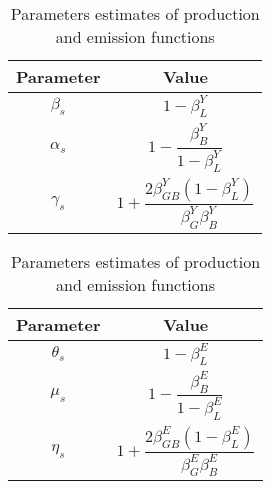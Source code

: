 \begin{table}[http]
    \centering
    \caption{\quad Parameters estimates of production and emission functions} \label{tab:estimate_parameters}
    \begin{tabular}{cc}
        \hline
        \textbf{Parameter} & \textbf{Value} \\
        \hline
        $\beta_{s}$ & $1-\beta_L^Y$ \vspace{5pt}
        \\
        $\alpha_{s}$ & $1-\dfrac{\beta_B^Y}{1-\beta_L^Y}$ \vspace{5pt}
        \\
        $\gamma_{s}$ & $1+\dfrac{2\beta_{GB}^Y(1-\beta_L^Y)}{\beta_G^Y\beta_B^Y}$ \vspace{5pt}
        \\
        \hline
    \end{tabular}
    \hspace{1cm}
    \begin{tabular}{cc}
      \hline
      \textbf{Parameter} & \textbf{Value} \\
      \hline
      $\theta_{s}$ & $1-\beta_L^E$ \vspace{5pt}
      \\
      $\mu_{s}$ & $1-\dfrac{\beta_B^E}{1-\beta_L^E}$ \vspace{5pt}
      \\
      $\eta_{s}$ & $1+\dfrac{2\beta_{GB}^E(1-\beta_L^E)}{\beta_G^E\beta_B^E}$ \vspace{5pt}
      \\
      \hline
  \end{tabular}
\end{table}


